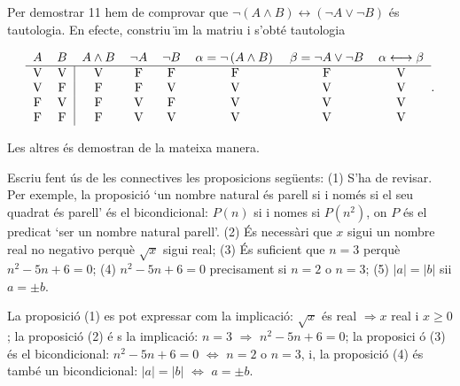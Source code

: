 Per demostrar 11 hem de comprovar que $\lnot(A\wedge B)\longleftrightarrow
\left( \lnot A\vee\lnot B\right) $ \'{e}s tautologia. En efecte, constriu%
\"{\i}m la matriu i s'obt\'{e} tautologia

\begin{equation*}
\begin{tabular}{llllllll}
$A$ & $B$ & $A\wedge B$ & $\lnot A$ & $\lnot B$ & $\alpha=\lnot\left(
A\wedge B\right) \,$ & $\beta=\lnot A\vee\lnot B$ & $\alpha%
\longleftrightarrow\beta $ \\ \hline
\multicolumn{1}{c}{V} & \multicolumn{1}{c|}{V} & \multicolumn{1}{c}{V} &
\multicolumn{1}{c}{F} & \multicolumn{1}{c}{F} & \multicolumn{1}{c}{F} &
\multicolumn{1}{c}{F} & \multicolumn{1}{c}{V} \\
\multicolumn{1}{c}{V} & \multicolumn{1}{c|}{F} & \multicolumn{1}{c}{F} &
\multicolumn{1}{c}{F} & \multicolumn{1}{c}{V} & \multicolumn{1}{c}{V} &
\multicolumn{1}{c}{V} & \multicolumn{1}{c}{V} \\
\multicolumn{1}{c}{F} & \multicolumn{1}{c|}{V} & \multicolumn{1}{c}{F} &
\multicolumn{1}{c}{V} & \multicolumn{1}{c}{F} & \multicolumn{1}{c}{V} &
\multicolumn{1}{c}{V} & \multicolumn{1}{c}{V} \\
\multicolumn{1}{c}{F} & \multicolumn{1}{c|}{F} & \multicolumn{1}{c}{F} &
\multicolumn{1}{c}{V} & \multicolumn{1}{c}{V} & \multicolumn{1}{c}{V} &
\multicolumn{1}{c}{V} & \multicolumn{1}{c}{V}%
\end{tabular}
.
\end{equation*}

Les altres \'{e}s demostran de la mateixa manera.

\begin{exem}
Escriu fent \'{u}s de les connectives les proposicions seg\"{u}ents: (1)
S'ha de revisar. Per exemple, la proposici\'{o} `un nombre natural \'{e}s
parell si i nom\'{e}s si el seu quadrat \'{e}s parell' \'{e}s el
bicondicional: $P(n)$ si i nomes si $P(n^{2})$, on $P$ \'{e}s el predicat
`ser un nombre natural parell'. (2) \'{E}s necess\`{a}ri que $x$ sigui un
nombre real no negativo perqu\`{e} $\sqrt{x}$ sigui real; (3) \'{E}s
suficient que $n=3$ perqu\`{e} $n^{2}-5n+6=0$; (4) $n^{2}-5n+6=0$
precisament si $n=2$ o $n=3$; (5) $\left\vert a\right\vert =\left\vert
b\right\vert $ sii $a=\pm b$.
\end{exem}

\begin{solucio}
La proposici\'{o} (1) es pot expressar com la implicaci\'{o}: $\sqrt{x}$
\'{e}s real $\Longrightarrow x$ real i $x\geq0$; la proposici\'{o} (2) \'{e}%
s la implicaci\'{o}: $n=3$ $\Longrightarrow$ $n^{2}-5n+6=0$; la proposici%
\'{o} (3) \'{e}s el bicondicional: $n^{2}-5n+6=0$ $\Longleftrightarrow$ $n=2
$ o $n=3$, i, la proposici\'{o} (4) \'{e}s tamb\'{e} un bicondicional: $%
\left\vert a\right\vert =\left\vert b\right\vert $ $\Longleftrightarrow$ $%
a=\pm b$.
\end{solucio}

